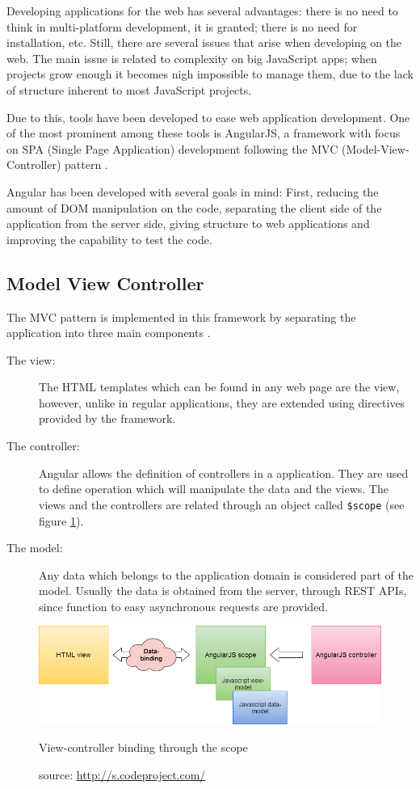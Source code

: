 Developing applications for the web has several advantages: there is no need to think in multi-platform development, it is granted; there is no need for installation, etc. Still, there are several issues that arise when developing on the web. The main issue is related to complexity on big JavaScript apps; when projects grow enough it becomes nigh impossible to manage them, due to the lack of structure inherent to most JavaScript projects.

Due to this, tools have been developed to ease web application development. One of the most prominent among these tools is AngularJS, a framework with focus on SPA (Single Page Application) development following the MVC (Model-View-Controller) pattern \cite{angularjs1, angularjs2}.

Angular has been developed with several goals in mind: First, reducing the amount of DOM manipulation on the code, separating the client side of the application from the server side, giving structure to web applications and improving the capability to test the code.

\subsection*{Model View Controller}

The MVC pattern is implemented in this framework by separating the application into three main components \cite{angularjs3}.

\begin{description}
\item[The view:] The HTML templates which can be found in any web page are the view, however, unlike in regular applications, they are extended using directives provided by the framework.
\item[The controller:] Angular allows the definition of controllers in a application. They are used to define operation which will manipulate the data and the views. The views and the controllers are related through an object called \texttt{\$scope} (see figure \ref{fig:angularscope}).
\item[The model:] Any data which belongs to the application domain is considered part of the model. Usually the data is obtained from the server, through REST APIs, since function to easy asynchronous requests are provided.
\end{description}

\begin{figure}
  \centering
  \includegraphics[width=.8\textwidth]{fig/angular-scope}
  \caption{View-controller binding through the scope}
  \caption*{source: \url{http://s.codeproject.com/}}
  \label{fig:angularscope}
\end{figure} 

